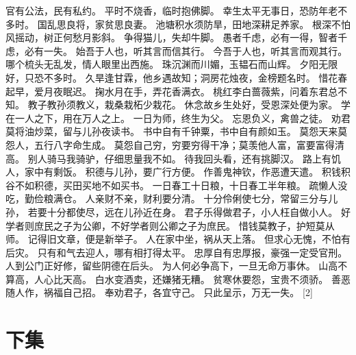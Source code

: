 \documentclass[12pt,UTF8]{ctexbook}
\begin{document}
官有公法，民有私约。
平时不烧香，临时抱佛脚。
幸生太平无事日，恐防年老不多时。
国乱思良将，家贫思良妻。
池塘积水须防旱，田地深耕足养家。
根深不怕风摇动，树正何愁月影斜。
争得猫儿，失却牛脚。
愚者千虑，必有一得，智者千虑，必有一失。
始吾于人也，听其言而信其行。
今吾于人也，听其言而观其行。
哪个梳头无乱发，情人眼里出西施。
珠沉渊而川媚，玉韫石而山辉。
夕阳无限好，只恐不多时。
久旱逢甘霖，他乡遇故知；洞房花烛夜，金榜题名时。
惜花春起早，爱月夜眠迟。
掬水月在手，弄花香满衣。
桃红李白蔷薇紫，问着东君总不知。
教子教孙须教义，栽桑栽柘少栽花。
休念故乡生处好，受恩深处便为家。
学在一人之下，用在万人之上。
一日为师，终生为父。
忘恩负义，禽兽之徒。
劝君莫将油炒菜，留与儿孙夜读书。
书中自有千钟粟，书中自有颜如玉。
莫怨天来莫怨人，五行八字命生成。
莫怨自己穷，穷要穷得干净；莫羡他人富，富要富得清高。
别人骑马我骑驴，仔细思量我不如。
待我回头看，还有挑脚汉。
路上有饥人，家中有剩饭。
积德与儿孙，要广行方便。
作善鬼神钦，作恶遭天遣。
积钱积谷不如积德，买田买地不如买书。
一日春工十日粮，十日春工半年粮。
疏懒人没吃，勤俭粮满仓。
人亲财不亲，财利要分清。
十分伶俐使七分，常留三分与儿孙，
若要十分都使尽，远在儿孙近在身。
君子乐得做君子，小人枉自做小人。
好学者则庶民之子为公卿，不好学者则公卿之子为庶民。
惜钱莫教子，护短莫从师。
记得旧文章，便是新举子。
人在家中坐，祸从天上落。
但求心无愧，不怕有后灾。
只有和气去迎人，哪有相打得太平。
忠厚自有忠厚报，豪强一定受官刑。
人到公门正好修，留些阴德在后头。
为人何必争高下，一旦无命万事休。
山高不算高，人心比天高。
白水变酒卖，还嫌猪无糟。
贫寒休要怨，宝贵不须骄。
善恶随人作，祸福自己招。
奉劝君子，各宜守己。
只此呈示，万无一失。 [2]

\chapter{下集}
\end{document}
